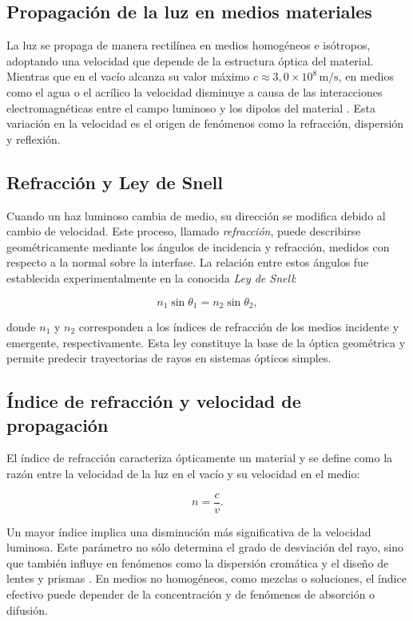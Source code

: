 \documentclass[11pt,twocolumn]{article}
\makeatletter
\let\orig@cite\cite
\renewcommand{\cite}[1]{\textcolor{Blue}{\orig@cite{#1}}}
\let\orig@parencite\parencite
\renewcommand{\parencite}[1]{\textcolor{Blue}{\orig@parencite{#1}}}
\renewcommand{\cite}[1]{\parencite{#1}}      %
\let\orig@cite\cite
\renewcommand{\cite}[1]{\textcolor{Blue}{\orig@cite{#1}}} %
\makeatother
\begin{document}
\subsection{Propagación de la luz en medios materiales}

La luz se propaga de manera rectilínea en medios homogéneos e isótropos, adoptando una velocidad que depende de la estructura óptica del material. Mientras que en el vacío alcanza su valor máximo $c \approx 3{,}0 \times 10^{8}\,\mathrm{m/s}$, en medios como el agua o el acrílico la velocidad disminuye a causa de las interacciones electromagnéticas entre el campo luminoso y los dipolos del material \cite{halliday_fundamentals_2014}. Esta variación en la velocidad es el origen de fenómenos como la refracción, dispersión y reflexión.

\subsection{Refracción y Ley de Snell}

Cuando un haz luminoso cambia de medio, su dirección se modifica debido al cambio de velocidad. Este proceso, llamado \textit{refracción}, puede describirse geométricamente mediante los ángulos de incidencia y refracción, medidos con respecto a la normal sobre la interfase. La relación entre estos ángulos fue establecida experimentalmente en la conocida \textit{Ley de Snell}:

\begin{equation}
    n_{1} \sin\theta_{1} = n_{2} \sin\theta_{2},
\end{equation}

donde $n_{1}$ y $n_{2}$ corresponden a los índices de refracción de los medios incidente y emergente, respectivamente. Esta ley constituye la base de la óptica geométrica y permite predecir trayectorias de rayos en sistemas ópticos simples.

\subsection{Índice de refracción y velocidad de propagación}

El índice de refracción caracteriza ópticamente un material y se define como la razón entre la velocidad de la luz en el vacío y su velocidad en el medio:

\[
n = \frac{c}{v}.
\]

Un mayor índice implica una disminución más significativa de la velocidad luminosa. Este parámetro no sólo determina el grado de desviación del rayo, sino que también influye en fenómenos como la dispersión cromática y el diseño de lentes y prismas \cite{serway_physics_2013}. En medios no homogéneos, como mezclas o soluciones, el índice efectivo puede depender de la concentración y de fenómenos de absorción o difusión.
\end{document}
